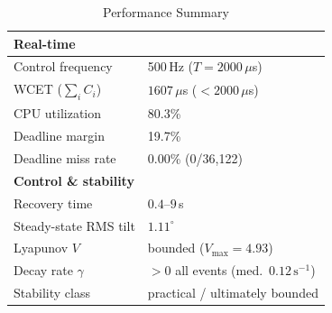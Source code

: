 \documentclass[conference]{IEEEtran}
\begin{document}
    \begin{table}[t]
      \caption{Performance Summary}
      \label{tab:summary}
      \centering
      \small
      \begin{tabular}{ll}
        \toprule
        \textbf{Real-time}            &                                               \\
        \midrule
        Control frequency             & 500\,Hz ($T=2000\,\mu$s)                      \\
        WCET ($\sum_i C_i$)           & $1607\,\mu$s ($<2000\,\mu$s)                  \\
        CPU utilization               & 80.3\%                                        \\
        Deadline margin               & 19.7\%                                        \\
        Deadline miss rate            & 0.00\% (0/36{,}122)                           \\
        \midrule
        \textbf{Control \& stability} &                                               \\
        \midrule
        Recovery time                 & $0.4$--$9\,$s                                 \\
        Steady-state RMS tilt         & $1.11^\circ$                                  \\
        Lyapunov $V$                  & bounded ($V_{\max}=4.93$)                     \\
        Decay rate $\gamma$           & $>0$ all events (med.\ $0.12\,\text{s}^{-1}$) \\
        Stability class               & practical / ultimately bounded                \\
        \bottomrule
      \end{tabular}
    \end{table}

\end{document}
